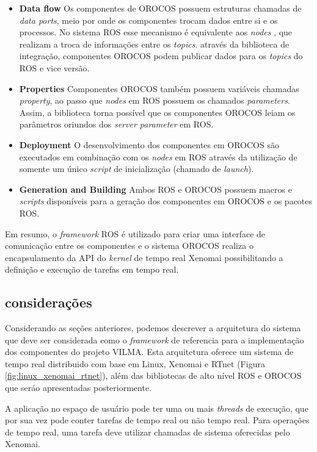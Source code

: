 \documentclass[conference]{IEEEtran}
\begin{document}
\begin{itemize}
	\item \textbf{Data flow} Os componentes de OROCOS possuem estruturas chamadas de \textit{data ports}, meio por onde os componentes trocam dados entre si e os processos. No sistema ROS esse mecanismo é equivalente aos \textit{nodes} , que realizam a troca de informações entre os \textit{topics}. através da biblioteca de integração, componentes OROCOS podem publicar dados para os \textit{topics} do ROS e vice versão.
	
	\item \textbf{Properties} Componentes OROCOS também possuem variáveis chamadas \textit{property}, ao passo que \textit{nodes} em ROS possuem os chamados \textit{parameters}. Assim, a biblioteca torna possível que os componentes OROCOS leiam os parâmetros oriundos dos \textit{server parameter} em ROS.
	
	\item \textbf{Deployment} O desenvolvimento dos componentes em OROCOS são executados em combinação com os \textit{nodes} em ROS através da utilização de somente um único \textit{script} de inicialização (chamado de \textit{launch}).
	
	\item \textbf{Generation and Building} Ambos ROS e OROCOS possuem macros e \textit{scripts} disponíveis para a geração dos componentes em OROCOS e os pacotes ROS.
\end{itemize}

Em resumo, o \textit{framework} ROS é utilizado para criar uma interface de comunicação entre os componentes e o sistema OROCOS realiza o encapsulamento da API do \textit{kernel} de tempo real Xenomai possibilitando a definição e execução de tarefas em tempo real.

\subsection{considerações}\label{subsec:env_considerations}

Considerando as seções anteriores, podemos descrever a arquitetura do sistema que deve ser considerada como o \textit{framework} de referencia para a implementação dos componentes do projeto VILMA. Esta arquitetura oferece um sistema de tempo real distribuido com base em Linux, Xenomai e RTnet (Figura \ref{fig:linux_xenomai_rtnet}), além das bibliotecas de alto nível ROS e OROCOS que seráo apresentadas posteriormente.

A aplicação no espaço de usuário pode ter uma ou mais \textit{threads} de execução, que por sua vez pode conter tarefas de tempo real ou não tempo real. Para operações de tempo real, uma tarefa deve utilizar chamadas de sistema oferecidas pelo Xenomai. 
\end{document}
